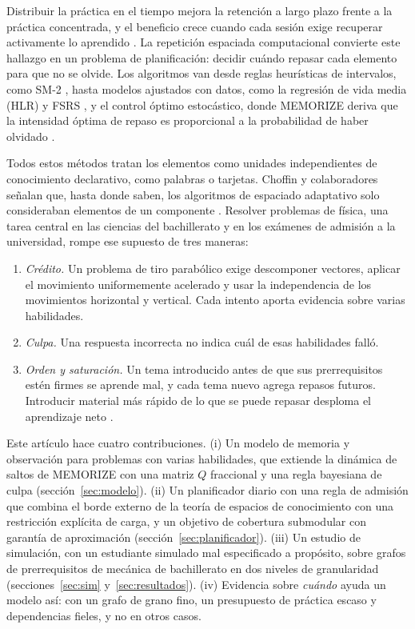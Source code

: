 \documentclass[runningheads]{llncs}
\begin{document}
Distribuir la práctica en el tiempo mejora la retención a largo plazo frente a la práctica concentrada, y el beneficio crece cuando cada sesión exige recuperar activamente lo aprendido \cite{cepeda2006,kang2016}. La repetición espaciada computacional convierte este hallazgo en un problema de planificación: decidir cuándo repasar cada elemento para que no se olvide. Los algoritmos van desde reglas heurísticas de intervalos, como SM-2 \cite{wozniak1990}, hasta modelos ajustados con datos, como la regresión de vida media (HLR) \cite{settles2016} y FSRS \cite{ye2022,su2023}, y el control óptimo estocástico, donde MEMORIZE deriva que la intensidad óptima de repaso es proporcional a la probabilidad de haber olvidado \cite{tabibian2019}.

Todos estos métodos tratan los elementos como unidades independientes de conocimiento declarativo, como palabras o tarjetas. Choffin y colaboradores señalan que, hasta donde saben, los algoritmos de espaciado adaptativo solo consideraban elementos de un componente \cite{choffin2021}. Resolver problemas de física, una tarea central en las ciencias del bachillerato y en los exámenes de admisión a la universidad, rompe ese supuesto de tres maneras:

\begin{enumerate}
\item \emph{Crédito.} Un problema de tiro parabólico exige descomponer vectores, aplicar el movimiento uniformemente acelerado y usar la independencia de los movimientos horizontal y vertical. Cada intento aporta evidencia sobre varias habilidades.
\item \emph{Culpa.} Una respuesta incorrecta no indica cuál de esas habilidades falló.
\item \emph{Orden y saturación.} Un tema introducido antes de que sus prerrequisitos estén firmes se aprende mal, y cada tema nuevo agrega repasos futuros. Introducir material más rápido de lo que se puede repasar desploma el aprendizaje neto \cite{reddy2016}.
\end{enumerate}

Este artículo hace cuatro contribuciones. (i) Un modelo de memoria y observación para problemas con varias habilidades, que extiende la dinámica de saltos de MEMORIZE con una matriz $Q$ fraccional y una regla bayesiana de culpa (sección~\ref{sec:modelo}). (ii) Un planificador diario con una regla de admisión que combina el borde externo de la teoría de espacios de conocimiento con una restricción explícita de carga, y un objetivo de cobertura submodular con garantía de aproximación (sección~\ref{sec:planificador}). (iii) Un estudio de simulación, con un estudiante simulado mal especificado a propósito, sobre grafos de prerrequisitos de mecánica de bachillerato en dos niveles de granularidad (secciones~\ref{sec:sim} y~\ref{sec:resultados}). (iv) Evidencia sobre \emph{cuándo} ayuda un modelo así: con un grafo de grano fino, un presupuesto de práctica escaso y dependencias fieles, y no en otros casos.
\end{document}
